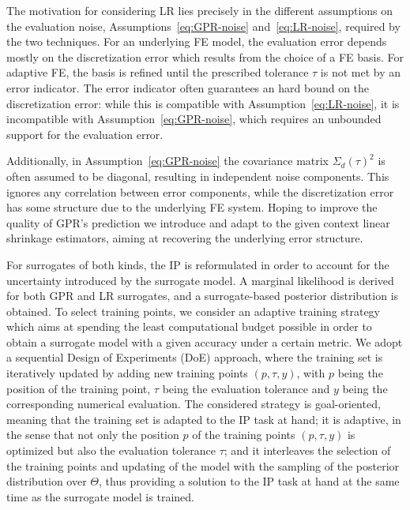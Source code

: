 The motivation for considering LR lies precisely in the different assumptions on the evaluation noise, Assumptions~\ref{eq:GPR-noise} and~\ref{eq:LR-noise}, required by the two techniques.
For an underlying FE model, the evaluation error depends mostly on the discretization error which results from the choice of a FE basis.
For adaptive FE, the basis is refined until the prescribed tolerance $\tau$ is not met by an error indicator.
The error indicator often guarantees an hard bound on the discretization error: while this is compatible with Assumption~\ref{eq:LR-noise}, it is incompatible with Assumption~\ref{eq:GPR-noise}, which requires an unbounded support for the evaluation error. 

Additionally, in Assumption~\ref{eq:GPR-noise} the covariance matrix $\Sigma_d(\tau)^2$ is often assumed to be diagonal, resulting in independent noise components. 
This ignores any correlation between error components, while the discretization error has some structure due to the underlying FE system.
Hoping to improve the quality of GPR's prediction we introduce and adapt to the given context linear shrinkage estimators, aiming at recovering the underlying error structure. \medskip

For surrogates of both kinds, the IP is reformulated in order to account for the uncertainty introduced by the surrogate model.
A marginal likelihood is derived for both GPR and LR surrogates, and a surrogate-based posterior distribution is obtained.
To select training points, we consider an adaptive training strategy which aims at spending the least computational budget possible in order to obtain a surrogate model with a given accuracy under a certain metric.
We adopt a sequential Design of Experiments (DoE) approach, where the training set is iteratively updated by adding new training points $(p,\tau,y)$, with $p$ being the position of the training point, $\tau$ being the evaluation tolerance and $y$ being the corresponding numerical evaluation.
The considered strategy is goal-oriented, meaning that the training set is adapted to the IP task at hand; it is adaptive, in the sense that not only the position $p$ of the training points $(p,\tau,y)$ is optimized but also the evaluation tolerance $\tau$; and it interleaves the selection of the training points and updating of the model with the sampling of the posterior distribution over $\Theta$, thus providing a solution to the IP task at hand at the same time as the surrogate model is trained. \medskip

